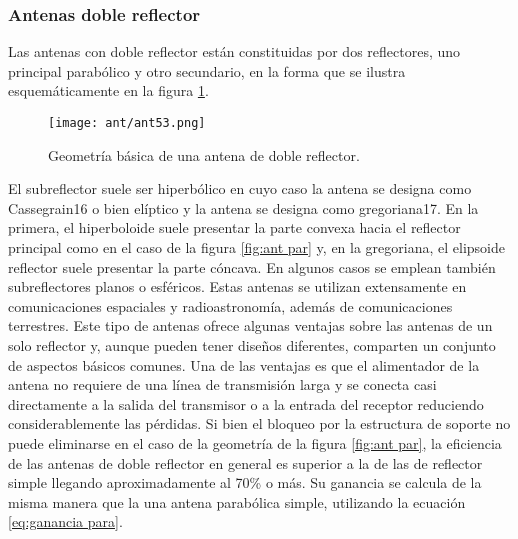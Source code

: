 \documentclass[
	12pt, %
	fleqn, %
	a4paper, %
	oneside, %
]{LegrandOrangeBook}
\begin{document}
\subsubsection{Antenas doble reflector}
Las antenas con doble reflector están constituidas por dos reflectores, uno principal parabólico y otro secundario, en la forma que se ilustra esquemáticamente en la figura \ref{fig:doble reflec}.
\begin{figure}[H]
\centering
\texttt{[image: ant/ant53.png]}
\caption{Geometría básica de una antena de doble reflector.}
\label{fig:doble reflec}
\end{figure}
El subreflector suele ser hiperbólico en cuyo caso la antena se designa como Cassegrain16 o bien elíptico y la antena se designa como gregoriana17. En la primera, el hiperboloide suele presentar la parte convexa hacia el reflector principal como en el caso de la figura \ref{fig:ant par} y, en la gregoriana, el elipsoide reflector suele presentar la parte cóncava. En algunos casos se emplean también subreflectores planos o esféricos. Estas antenas se utilizan extensamente en comunicaciones espaciales y radioastronomía, además de comunicaciones terrestres. Este
tipo de antenas ofrece algunas ventajas sobre las antenas de un solo reflector y, aunque pueden tener diseños diferentes, comparten un conjunto de aspectos básicos comunes. Una de
las ventajas es que el alimentador de la antena no requiere de una línea de transmisión larga y se conecta casi directamente a la salida del transmisor o a la entrada del receptor reduciendo considerablemente las pérdidas. Si bien el bloqueo por la estructura de soporte no puede eliminarse en el caso de la geometría de la figura \ref{fig:ant par}, la eficiencia de las antenas de doble reflector en general es superior a la de las de reflector simple llegando aproximadamente al
70\% o más. Su ganancia se calcula de la misma manera que la una antena parabólica simple, utilizando la ecuación \ref{eq:ganancia para}.
\end{document}
